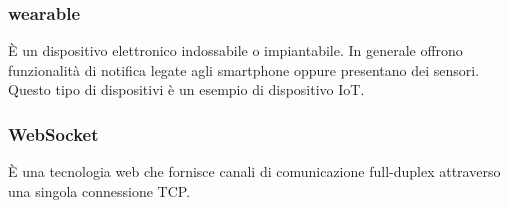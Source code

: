     \subsubsection{\label{Wear}wearable}
      È un dispositivo elettronico indossabile o impiantabile. In generale offrono funzionalità di notifica legate agli smartphone oppure presentano dei sensori. Questo tipo di dispositivi è un esempio di dispositivo IoT.
    \subsubsection{\label{Web}WebSocket}
      È una tecnologia web che fornisce canali di comunicazione full-duplex attraverso una singola connessione TCP.
      \newpage
      \null
      \thispagestyle{empty}
      
